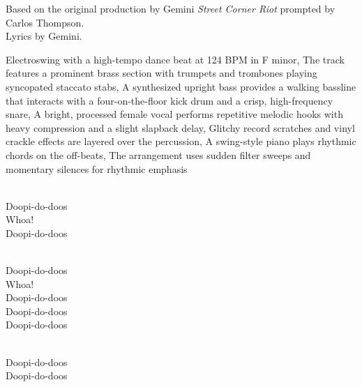 
\begin{notes}
Based on the original production by Gemini \emph{Street Corner Riot} prompted by Carlos Thompson.\\
Lyrics by Gemini.
\end{notes}
\begin{style}
Electroswing with a high-tempo dance beat at 124 BPM in F minor, The track features a prominent brass section with trumpets and trombones playing syncopated staccato stabs, A synthesized upright bass provides a walking bassline that interacts with a four-on-the-floor kick drum and a crisp, high-frequency snare, A bright, processed female vocal performs repetitive melodic hooks with heavy compression and a slight slapback delay, Glitchy record scratches and vinyl crackle effects are layered over the percussion, A swing-style piano plays rhythmic chords on the off-beats, The arrangement uses sudden filter sweeps and momentary silences for rhythmic emphasis
\end{style}
\begin{lyrics}
\\
Doopi-do-doos
\\
Whoa!
\\
Doopi-do-doos

\\
Doopi-do-doos\\
Whoa!\\
Doopi-do-doos\\
Doopi-do-doos\\
Doopi-do-doos

\\
Doopi-do-doos\\
Doopi-do-doos
\end{lyrics}

